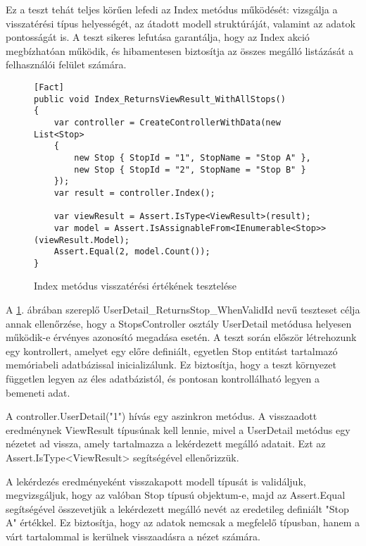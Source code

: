 Ez a teszt tehát teljes körűen lefedi az Index metódus működését: vizsgálja a visszatérési típus helyességét, az átadott modell struktúráját, valamint az adatok pontosságát is. A teszt sikeres lefutása garantálja, hogy az Index akció megbízhatóan működik, és hibamentesen biztosítja az összes megálló listázását a felhasználói felület számára.

\begin{figure}[H]
\caption{Index metódus visszatérési értékének tesztelése}
\label{fig:index-test-method}
\begin{minipage}{\textwidth}
\begin{BVerbatim}
[Fact]
public void Index_ReturnsViewResult_WithAllStops()
{
    var controller = CreateControllerWithData(new List<Stop>
    {
        new Stop { StopId = "1", StopName = "Stop A" },
        new Stop { StopId = "2", StopName = "Stop B" }
    });
    var result = controller.Index();

    var viewResult = Assert.IsType<ViewResult>(result);
    var model = Assert.IsAssignableFrom<IEnumerable<Stop>>(viewResult.Model);
    Assert.Equal(2, model.Count());
}
\end{BVerbatim}
\end{minipage}
\end{figure}

A \ref{fig:index-test-method}. ábrában szereplő UserDetail\_ReturnsStop\_WhenValidId nevű teszteset célja annak ellenőrzése, hogy a StopsController osztály UserDetail metódusa helyesen működik-e érvényes azonosító megadása esetén. A teszt során először létrehozunk egy kontrollert, amelyet egy előre definiált, egyetlen Stop entitást tartalmazó memóriabeli adatbázissal inicializálunk. Ez biztosítja, hogy a teszt környezet független legyen az éles adatbázistól, és pontosan kontrollálható legyen a bemeneti adat.

A controller.UserDetail("1") hívás egy aszinkron metódus. A visszaadott eredménynek ViewResult típusúnak kell lennie, mivel a UserDetail metódus egy nézetet ad vissza, amely tartalmazza a lekérdezett megálló adatait. Ezt az Assert.IsType<ViewResult> segítségével ellenőrizzük.

A lekérdezés eredményeként visszakapott modell típusát is validáljuk, megvizsgáljuk, hogy az valóban Stop típusú objektum-e, majd az Assert.Equal segítségével összevetjük a lekérdezett megálló nevét az eredetileg definiált "Stop A" értékkel. Ez biztosítja, hogy az adatok nemcsak a megfelelő típusban, hanem a várt tartalommal is kerülnek visszaadásra a nézet számára.

